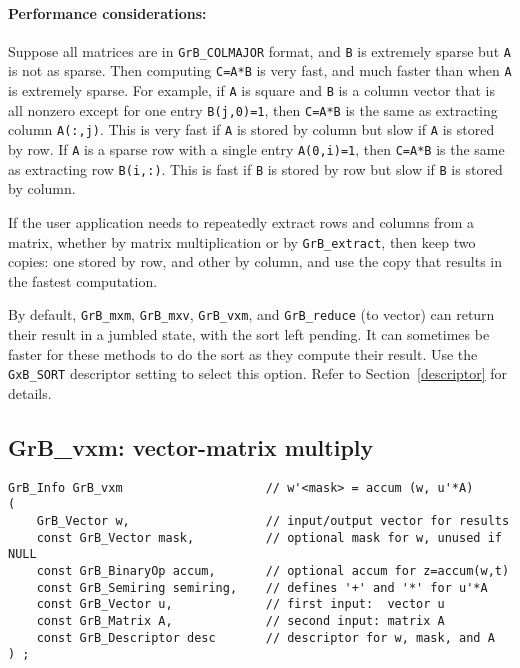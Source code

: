 \documentclass[12pt]{article}
\begin{document}
\paragraph{\bf Performance considerations:}
Suppose all matrices are in \verb'GrB_COLMAJOR' format, and \verb'B' is extremely
sparse but \verb'A' is not as sparse.  Then computing \verb'C=A*B' is very
fast, and much faster than when \verb'A' is extremely sparse.  For example, if
\verb'A' is square and \verb'B' is a column vector that is all nonzero except
for one entry \verb'B(j,0)=1', then \verb'C=A*B' is the same as extracting
column \verb'A(:,j)'.  This is very fast if \verb'A' is stored by column but
slow if \verb'A' is stored by row.  If \verb'A' is a sparse row with a single
entry \verb'A(0,i)=1', then \verb'C=A*B' is the same as extracting row
\verb'B(i,:)'.  This is fast if \verb'B' is stored by row but slow if \verb'B'
is stored by column.

If the user application needs to repeatedly extract rows and columns from a
matrix, whether by matrix multiplication or by \verb'GrB_extract', then keep
two copies: one stored by row, and other by column, and use the copy that
results in the fastest computation.

By default, \verb'GrB_mxm', \verb'GrB_mxv', \verb'GrB_vxm', and
\verb'GrB_reduce' (to vector) can return their result in a jumbled state, with
the sort left pending.  It can sometimes be faster for these methods to do the
sort as they compute their result.  Use the \verb'GxB_SORT' descriptor setting
to select this option.  Refer to Section~\ref{descriptor} for details.

\newpage
\subsection{{\sf GrB\_vxm:} vector-matrix multiply} %
\label{vxm}

\begin{mdframed}[userdefinedwidth=6in]
{\footnotesize
\begin{verbatim}
GrB_Info GrB_vxm                    // w'<mask> = accum (w, u'*A)
(
    GrB_Vector w,                   // input/output vector for results
    const GrB_Vector mask,          // optional mask for w, unused if NULL
    const GrB_BinaryOp accum,       // optional accum for z=accum(w,t)
    const GrB_Semiring semiring,    // defines '+' and '*' for u'*A
    const GrB_Vector u,             // first input:  vector u
    const GrB_Matrix A,             // second input: matrix A
    const GrB_Descriptor desc       // descriptor for w, mask, and A
) ;
\end{verbatim} } \end{mdframed}
\end{document}
